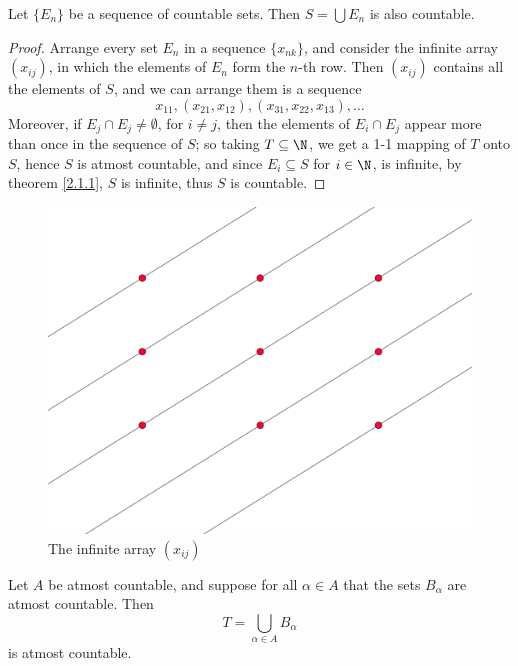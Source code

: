 \begin{theorem}\label{2.1.2}
    Let $\{E_n\}$ be a sequence of countable sets. Then  $S=\bigcup{E_n}$ is also countable.
\end{theorem}
\begin{proof}
    Arrange every set $E_n$ in a sequence  $\{x_{nk}\}$, and consider the infinite array 
    $(x_{ij})$, in which the elements of  $E_n$ form the  $n$-th row. Then  $(x_{ij})$ contains 
    all the elements of  $S$, and we can arrange them is a sequence
        \begin{equation*}
            x_{11}, (x_{21},x_{12}), (x_{31},x_{22},x_{13}), \dots
        \end{equation*}
    Moreover, if $E_j \cap E_j \neq \emptyset$, for  $i \neq j$, then the elements of  $E_i \cap E_j$ 
    appear more than once in the sequence of  $S$; so taking  $T \subseteq \N$, we get
    a 1-1 mapping of  $T$ onto  $S$, hence  $S$ is atmost countable, and since $E_i \subseteq S$ 
    for  $i \in \N$, is infinite, by theorem \ref{2.1.1},  $S$ is infinite, thus  $S$ is 
    countable.
\end{proof}

\begin{figure}
    \centering
    \includegraphics[scale = 0.05]{Figures/diagonalizationArray.png}
    \caption{The infinite array $(x_{ij})$}
    \label{fig_2.1}
\end{figure}

\begin{corollary}
    Let $A$ be atmost countable, and suppose for all  $\alpha \in A$ that the sets 
    $B_{\alpha}$ are atmost countable. Then 
        \begin{equation*}
            T=\bigcup_{\alpha \in A}{B_{\alpha}}
        \end{equation*}
    is atmost countable.
\end{corollary}

